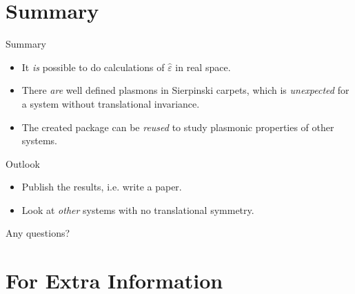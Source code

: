 \documentclass{beamer}
\begin{document}
\section{Summary}

\begin{frame}{Summary}
  \begin{itemize}
  \item \Large{It \emph{is} possible to do calculations of $\hat\varepsilon$ in real space.}
  \item \Large{There \emph{are} well defined plasmons in Sierpinski carpets, which is \emph{unexpected} for a system without translational invariance.}
  \item \Large{The created package can be \emph{reused} to study plasmonic properties of other systems.}
  \end{itemize}
\end{frame}

\begin{frame}{Outlook}
    \begin{itemize}
    \item \Large{Publish the results, i.e. write a paper.}
    \item \Large{Look at \emph{other} systems with no translational symmetry.}
    \end{itemize}
\end{frame}

\begin{frame}{}
    \vfill
    \begin{minipage}{\textwidth}
    \begin{center}
        \Large Any questions?
    \end{center}
    \end{minipage}
    \vfill
\end{frame}


\appendix

\section{For Extra Information}
\end{document}

